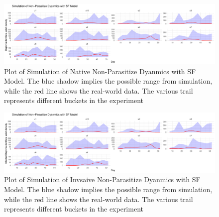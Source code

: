 \documentclass[12pt]{article}
\begin{document}
\begin{figure}[H]
\centering
\includegraphics{si-012}
\caption{Plot of Simulation of Native Non-Parasitize Dyanmics with SF Model. The blue shadow implies the possible range from simulation, while the red line shows the real-world data. The various trail represents different buckets in the experiment}
\end{figure}

\begin{figure}[H]
\centering
\includegraphics{si-013}
\caption{Plot of Simulation of Invsaive Non-Parasitize Dyanmics with SF Model. The blue shadow implies the possible range from simulation, while the red line shows the real-world data. The various trail represents different buckets in the experiment}
\end{figure}

\newpage
\end{document}
